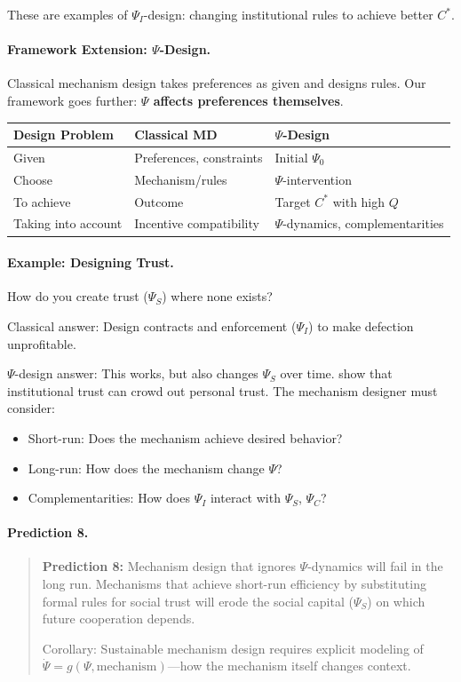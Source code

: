 These are examples of $\Psi_I$-design: changing institutional rules to achieve
better $C^*$.

\paragraph{Framework Extension: $\Psi$-Design.}
Classical mechanism design takes preferences as given and designs rules.
Our framework goes further: \textbf{$\Psi$ affects preferences themselves}.

\begin{center}
\renewcommand{\arraystretch}{1.3}
\begin{tabular}{lll}
\hline
\textbf{Design Problem} & \textbf{Classical MD} & \textbf{$\Psi$-Design} \\
\hline
Given & Preferences, constraints & Initial $\Psi_0$ \\
Choose & Mechanism/rules & $\Psi$-intervention \\
To achieve & Outcome & Target $C^*$ with high $Q$ \\
Taking into account & Incentive compatibility & $\Psi$-dynamics, complementarities \\
\hline
\end{tabular}
\end{center}

\paragraph{Example: Designing Trust.}
How do you create trust ($\Psi_S$) where none exists?

Classical answer: Design contracts and enforcement ($\Psi_I$) to make
defection unprofitable.

$\Psi$-design answer: This works, but also changes $\Psi_S$ over time.
\citet{bohnet2004} show that institutional trust can crowd out personal trust.
The mechanism designer must consider:
\begin{itemize}
  \item Short-run: Does the mechanism achieve desired behavior?
  \item Long-run: How does the mechanism change $\Psi$?
  \item Complementarities: How does $\Psi_I$ interact with $\Psi_S$, $\Psi_C$?
\end{itemize}

\paragraph{Prediction 8.}
\begin{quote}
\textbf{Prediction 8:} Mechanism design that ignores $\Psi$-dynamics will
fail in the long run. Mechanisms that achieve short-run efficiency by
substituting formal rules for social trust will erode the social capital
($\Psi_S$) on which future cooperation depends.

Corollary: Sustainable mechanism design requires explicit modeling of
$\dot{\Psi} = g(\Psi, \text{mechanism})$---how the mechanism itself changes context.
\end{quote}

